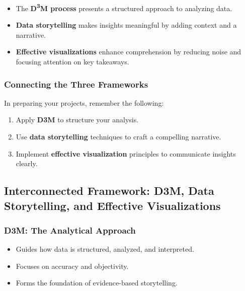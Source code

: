 \documentclass[
  11pt,
]{article}
\providecommand{\tightlist}{%
  \setlength{\itemsep}{0pt}\setlength{\parskip}{0pt}}
\begin{document}
\begin{itemize}
\tightlist
\item
  The \textbf{D\textsuperscript{3}M process} presents a structured
  approach to analyzing data.
\item
  \textbf{Data storytelling} makes insights meaningful by adding context
  and a narrative.
\item
  \textbf{Effective visualizations} enhance comprehension by reducing
  noise and focusing attention on key takeaways.
\end{itemize}

\subsubsection{\texorpdfstring{\textbf{Connecting the Three
Frameworks}}{Connecting the Three Frameworks}}\label{connecting-the-three-frameworks}

In preparing your projects, remember the following:

\begin{enumerate}
\def\labelenumi{\arabic{enumi}.}
\tightlist
\item
  Apply \textbf{D3M} to structure your analysis.
\item
  Use \textbf{data storytelling} techniques to craft a compelling
  narrative.
\item
  Implement \textbf{effective visualization} principles to communicate
  insights clearly.
\end{enumerate}

\subsection{\texorpdfstring{\textbf{Interconnected Framework: D3M, Data
Storytelling, and Effective
Visualizations}}{Interconnected Framework: D3M, Data Storytelling, and Effective Visualizations}}\label{interconnected-framework-d3m-data-storytelling-and-effective-visualizations}

\subsubsection{\texorpdfstring{\textbf{D3M: The Analytical
Approach}}{D3M: The Analytical Approach}}\label{d3m-the-analytical-approach}

\begin{itemize}
\tightlist
\item
  Guides how data is structured, analyzed, and interpreted.
\item
  Focuses on accuracy and objectivity.
\item
  Forms the foundation of evidence-based storytelling.
\end{itemize}
\end{document}
